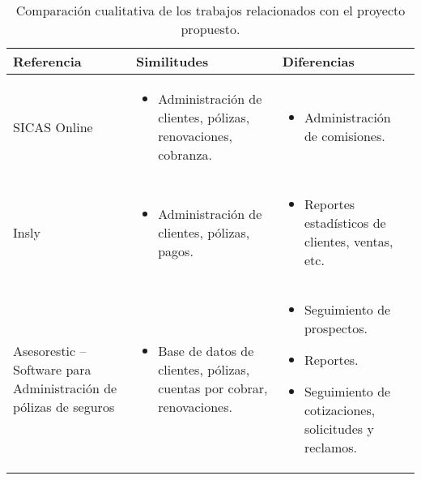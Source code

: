 \begin{table}[H] %
  \begin{tabular}{p{} p{} p{}}
    \toprule
    \textbf{{Referencia}} & \textbf{{Similitudes}} & \textbf{{Diferencias}} \\
    \toprule
    SICAS Online &
    \begin{itemize}[leftmargin=*]
        \item Administración de clientes, pólizas, renovaciones, cobranza.
    \end{itemize} &
    \begin{itemize}[leftmargin=*]
        \item Administración de comisiones.
    \end{itemize} \\
    \midrule
    Insly &
    \begin{itemize}[leftmargin=*]
        \item Administración de clientes, pólizas, pagos.
    \end{itemize} &
    \begin{itemize}[leftmargin=*]
        \item Reportes estadísticos de clientes, ventas, etc.
    \end{itemize} \\
\midrule
Asesorestic – Software para Administración de pólizas de seguros &
\begin{itemize}[leftmargin=*]
	\item Base de datos de clientes, pólizas, cuentas por cobrar, renovaciones.
\end{itemize} &
\begin{itemize}[leftmargin=*]
	\item Seguimiento de prospectos.
	\item Reportes.
	\item Seguimiento de cotizaciones, solicitudes y reclamos.
\end{itemize} \\

    \bottomrule
  \end{tabular}
  \caption{Comparación cualitativa de los trabajos relacionados con el proyecto propuesto.}
  \label{table:related}
\end{table}
